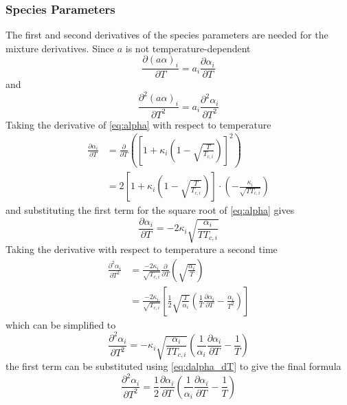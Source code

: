 \documentclass{article}
\newcommand{\pderiv}[2]{\frac{\partial #1}{\partial #2}}
\newcommand{\npderiv}[3]{\frac{\partial^#1 #2}{\partial #3^#1}}
\begin{document}
\subsubsection{Species Parameters}
The first and second derivatives of the species parameters are needed for the mixture derivatives. Since $a$ is not temperature-dependent
\begin{equation}
    \pderiv{(a\alpha)_i}{T} = a_i \pderiv{\alpha_i}{T}
\end{equation}
and
\begin{equation}
    \npderiv{2}{(a\alpha)_i}{T} = a_i \npderiv{2}{\alpha_i}{T}
\end{equation}
Taking the derivative of \eqref{eq:alpha} with respect to temperature
\begin{align*}
    \pderiv{\alpha_i}{T} &= \pderiv{}{T}\left( \left[1 + \kappa_i\left(1 - \sqrt{\frac{T}{T_{c,i}}}\right)\right]^2 \right) \\
    &= 2 \left[1 + \kappa_i\left(1 - \sqrt{\frac{T}{T_{c,i}}}\right)\right] \cdot \left(-\frac{\kappa_i}{\sqrt{TT_{c,i}}}\right)
\end{align*}
and substituting the first term for the square root of \eqref{eq:alpha} gives
\begin{equation}
    \pderiv{\alpha_i}{T} = -2\kappa_i\sqrt{\frac{\alpha_i}{TT_{c,i}}} \label{eq:dalpha_dT}
\end{equation}
Taking the derivative with respect to temperature a second time
\begin{align*}
    \npderiv{2}{\alpha_i}{T} &= \frac{-2\kappa_i}{\sqrt{T_{c,i}}} \pderiv{}{T}\left(\sqrt{\frac{\alpha_i}{T}}\right) \\
    &= \frac{-2\kappa_i}{\sqrt{T_{c,i}}} \left[\frac{1}{2}\sqrt{\frac{T}{\alpha_i}}\left(\frac{1}{T}\pderiv{\alpha_i}{T} -\frac{\alpha_i}{T^2}\right)\right]
\end{align*}
which can be simplified to
\begin{equation*}
     \npderiv{2}{\alpha_i}{T} = -\kappa_i\sqrt{\frac{\alpha_i}{TT_{c,i}}}\left(\frac{1}{\alpha_i}\pderiv{\alpha_i}{T} - \frac{1}{T} \right)
\end{equation*}
the first term can be substituted using \eqref{eq:dalpha_dT} to give the final formula
\begin{equation}
     \npderiv{2}{\alpha_i}{T} = \frac{1}{2} \pderiv{\alpha_i}{T} \left(\frac{1}{\alpha_i}\pderiv{\alpha_i}{T} - \frac{1}{T} \right)
\end{equation}

\clearpage
\printbibliography
\end{document}
